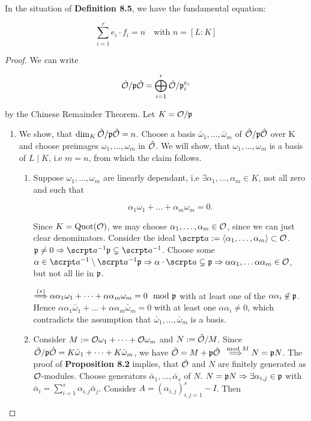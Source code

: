 \begin{Satz}
	In the situation of \textbf{Definition 8.5}, we have the fundamental equation:
	
	\[ \sum_{i=1}^r e_i \cdot f_i = n \quad \text{with } n = \left[ L:K\right]     \]
\end{Satz}
\begin{proof}
	We can write
	
	\[ \hat{\mathcal{O}} / \mathfrak{p}\hat{\mathcal{O}} = \bigoplus_{i=1}^r	\hat{\mathcal{O}} / \mathfrak{p}_i^{e_i}	\]
	
	by the Chinese Remainder Theorem. Let $K = \mathcal{O} / \mathfrak{p}$
	
	\begin{enumerate}[Step 1:]
		\item We show, that $\dim_K \hat{\mathcal{O}}/\mathfrak{p}\hat{\mathcal{O}} = n$. Choose a basis $\bar\omega_1, \dots, \bar\omega_m$ of $\hat{\mathcal{O}}/\mathfrak{p}\hat{\mathcal{O}}$ over K and choose preimages $\omega_1, \dots, \omega_m$ in $\hat{\mathcal{O}}$. We will show, that $\omega_1, \dots, \omega_m$ is a basis of $L \mid K$, i.e $m = n$, from which the claim follows.
		
		\begin{enumerate}[(1)]
			\item Suppose $\omega_1, \dots, \omega_m$ are linearly dependant, i.e $\exists \alpha_1, \dots, \alpha_m \in K$, not all zero and such that
			 
			 \[  \alpha_1\omega_1 + \dots + \alpha_m\omega_m = 0. \tag{$\ast$}     \]
			 
			 Since $K = \operatorname{Quot}(\mathcal{O})$, we may choose $\alpha_1, \dots, \alpha_m \in \mathcal{O}$, since we can just clear denominators. Consider the ideal $\a := \left\langle \alpha_1, \dots, \alpha_m \right\rangle \subset \O$. $\p \neq 0 \Rightarrow \a^{-1}\p \subsetneq \a^{-1}$. Choose some $\alpha \in \a^{-1} \setminus \a^{-1}\p \Rightarrow \alpha \cdot \a \subsetneq \p \Rightarrow \alpha\alpha_1, \dots \alpha\alpha_m \in \O$, but not all lie in $\mathfrak{p}$.
			 
			 $\overset{(\ast)}{\Longrightarrow} \alpha\alpha_1\omega_1 + \dots + \alpha\alpha_m\omega_m = 0 \mod {\mathfrak{p}}$ with at least one of the $\alpha\alpha_i \not\in \mathfrak{p}$. Hence $\alpha\alpha_1\bar\omega_1 + \dots + \alpha\alpha_m\bar\omega_m = 0$ with at least one $\alpha\alpha_i \neq 0$, which contradicts the assumption that $\bar\omega_1, \dots, \bar\omega_m$ is a basis.
			 
			 \item Consider $M := \mathcal{O}\omega_1 + \dots + \mathcal{O}\omega_m$ and $N:= \hat{\mathcal{O}}/M$. Since $\hat{\mathcal{O}}/\mathfrak{p}\hat{\mathcal{O}} = K\bar\omega_1 + \dots + K\bar\omega_m$, we have $\hat{\mathcal{O}} = M + \mathfrak{p}\hat{\mathcal{O}} \overset{\mod M}{\Longrightarrow} N = \mathfrak{p} N$. The proof of \textbf{Proposition 8.2} implies, that $\hat{\mathcal{O}}$ and $N$ are finitely generated as $\mathcal{O}$-modules. Choose generators $\bar\alpha_1, \dots, \bar\alpha_s$ of $N$. $N = \mathfrak{p} N \Rightarrow \exists \alpha_{i,j} \in \mathfrak{p}$ with $\bar\alpha_i = \sum_{i=1}^s \alpha_{i,j}\bar\alpha_j$. Consider $A = (\alpha_{i,j})_{i,j=1}^s - I$. Then
			 

\end{enumerate}
\end{enumerate}
\end{proof}
